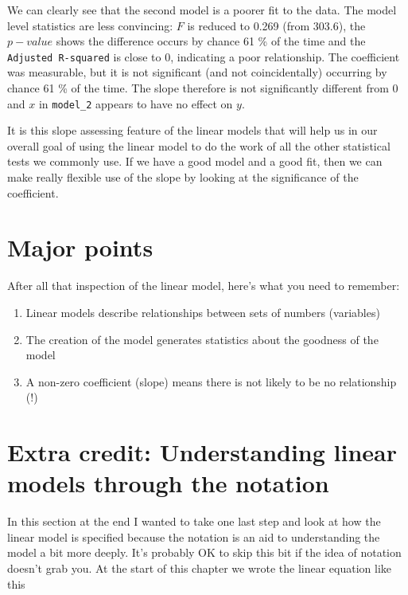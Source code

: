 \documentclass[
]{book}
\providecommand{\tightlist}{%
  \setlength{\itemsep}{0pt}\setlength{\parskip}{0pt}}
\begin{document}
We can clearly see that the second model is a poorer fit to the data. The model level statistics are less convincing: \(F\) is reduced to 0.269 (from 303.6), the \(p-value\) shows the difference occurs by chance 61 \% of the time and the \texttt{Adjusted\ R-squared} is close to 0, indicating a poor relationship. The coefficient was measurable, but it is not significant (and not coincidentally) occurring by chance 61 \% of the time. The slope therefore is not significantly different from 0 and \(x\) in \texttt{model\_2} appears to have no effect on \(y\).

It is this slope assessing feature of the linear models that will help us in our overall goal of using the linear model to do the work of all the other statistical tests we commonly use. If we have a good model and a good fit, then we can make really flexible use of the slope by looking at the significance of the coefficient.

\hypertarget{major-points}{%
\section{Major points}\label{major-points}}

After all that inspection of the linear model, here's what you need to remember:

\begin{enumerate}
\def\labelenumi{\arabic{enumi}.}
\tightlist
\item
  Linear models describe relationships between sets of numbers (variables)
\item
  The creation of the model generates statistics about the goodness of the model
\item
  A non-zero coefficient (slope) means there is not likely to be no relationship (!)
\end{enumerate}

\hypertarget{extra-credit-understanding-linear-models-through-the-notation}{%
\section{Extra credit: Understanding linear models through the notation}\label{extra-credit-understanding-linear-models-through-the-notation}}

In this section at the end I wanted to take one last step and look at how the linear model is specified because the notation is an aid to understanding the model a bit more deeply. It's probably OK to skip this bit if the idea of notation doesn't grab you.
At the start of this chapter we wrote the linear equation like this
\end{document}
